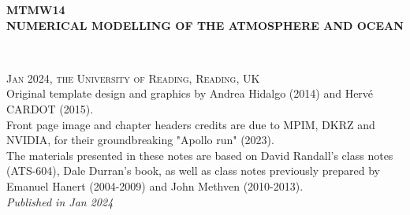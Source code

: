 \documentclass[11pt,fleqn]{book} %
\begin{document}
	
	\let\cleardoublepage\clearpage
	
	
	\begingroup
	\thispagestyle{empty}
	\centering
	\vspace*{0cm}
	\par\normalfont\fontsize{30}{25}\sffamily\selectfont
	\textbf{MTMW14\\NUMERICAL MODELLING OF THE ATMOSPHERE AND OCEAN}\\
	{\LARGE }\par %
	\vspace*{1cm}
	{\color{white}{\Huge P.L. Vidale \\ January 2024}}\par %
	\endgroup
	
	
	\newpage
	~\vfill
	\thispagestyle{empty}
	
	
	\noindent \textsc{Jan 2024, the University of Reading, Reading, UK}\\
	
	\noindent Original template design and graphics by Andrea Hidalgo (2014) and Hervé CARDOT (2015).\\ %
	
	\noindent Front page image and chapter headers credits are due to MPIM, DKRZ and NVIDIA, for their groundbreaking "Apollo run" (2023).\\ %
	
	\noindent The materials presented in these notes are based on David Randall's class notes (ATS-604), Dale Durran's book, as well as class notes previously prepared by Emanuel Hanert (2004-2009) and John Methven (2010-2013).\\ %
	
	\noindent \textit{Published in Jan 2024} %
	
\end{document}
